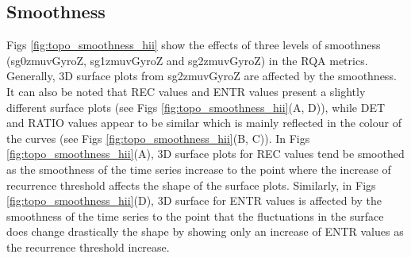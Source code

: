 \subsection{Smoothness}
Figs \ref{fig:topo_smoothness_hii} show the effects of three levels of 
smoothness (sg0zmuvGyroZ, sg1zmuvGyroZ and sg2zmuvGyroZ) in the RQA metrics.
Generally, 3D surface plots from sg2zmuvGyroZ are affected by the smoothness.
It can also be noted that REC values and ENTR values present a slightly 
different surface plots (see Figs \ref{fig:topo_smoothness_hii}(A, D)), 
while DET and RATIO values appear to be similar which is mainly reflected in 
the colour of the curves (see Figs \ref{fig:topo_smoothness_hii}(B, C)).
In Figs \ref{fig:topo_smoothness_hii}(A), 3D surface plots for REC values tend be 
smoothed as the smoothness of the time series increase to the point where 
the increase of recurrence threshold affects the shape of the surface plots.
Similarly, in Figs  \ref{fig:topo_smoothness_hii}(D), 
3D surface for ENTR values is affected by the smoothness of the 
time series to the point that the fluctuations in the surface does change 
drastically the shape by showing only an increase of ENTR values as
the recurrence threshold increase.

